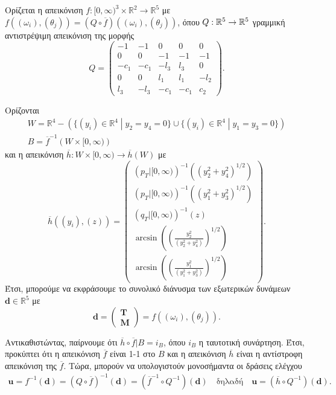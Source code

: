 Ορίζεται η απεικόνιση $f:[0, \infty)^3\times \mathbb{R}^2\rightarrow \mathbb{R}
^5$ με  ${f}\left( (\omega_i),(\theta_j) \right) = \left(Q \circ \overline{f} 
\right)\left( (\omega_i),(\theta_j) \right)$, όπου $Q:\mathbb{R}^{5} \rightarrow 
\mathbb{R}^{5}$ γραμμική αντιστρέψιμη απεικόνιση της μορφής
\begin{equation*}
    Q =
    \begin{pmatrix}
        -1  & -1   & 0    & 0   & 0    \\
        0   & 0    & -1   & -1  & -1   \\
        -c_1 & -c_1  & -l_3 & l_3 & 0    \\
        0   & 0    & l_1  & l_1 & -l_2 \\
        l_3 & -l_3 & -c_1  & -c_1 & c_2
    \end{pmatrix}.
\end{equation*}

Ορίζονται
\begin{gather*}
    W = \mathbb{R}^4 - \left( \{(y_i)\in\mathbb{R}^4 \middle| y_2=y_4=0\}
    \cup \{(y_i)\in\mathbb{R}^4 \middle| y_1=y_3=0\}\right) \\
    B = \overline{f}^{-1}\left(W\times[0,\infty)\right)
\end{gather*}
και η απεικόνιση $\overline{h}:W\times[0,\infty) \rightarrow\overline{h}(W)$ με
\begin{equation*}
    \overline{h}\left((y_i),(z)\right) =
    \begin{pmatrix}
        \left(p_T\big|[0,\infty)\right)^{-1}\left((y_2^2+y_4^2)^{1/2}\right) \\
        \left(p_T\big|[0,\infty)\right)^{-1}\left((y_1^2+y_3^2)^{1/2}\right) \\
        \left(q_T\big|[0,\infty)\right)^{-1}\left(z\right)                  \\
        \arcsin\left(\left(\frac{y_2^2}{(y_2^2+y_4^2)}\right)^{1/2}\right) \\
        \arcsin\left(\left(\frac{y_1^2}{(y_1^2+y_3^2)}\right)^{1/2}\right)
    \end{pmatrix}.
\end{equation*}
Έτσι, μπορούμε να εκφράσουμε το συνολικό διάνυσμα των εξωτερικών δυνάμεων 
$\mathbf{d} \in \mathbb{R}^5$ με
\begin{equation*}
    \mathbf{d} = 
    \begin{pmatrix}
        \mathbf{T} \\[6pt]
        \mathbf{M}
    \end{pmatrix}
    = {f}\left( (\omega_i),(\theta_j) \right).
\end{equation*}

Αντικαθιστώντας, παίρνουμε ότι $\overline{h}\circ\overline{f}\big|B = i_B$, όπου
$i_B$ η ταυτοτική συνάρτηση. Έτσι, προκύπτει ότι η απεικόνιση $\overline{f}$ 
είναι 1-1 στο $B$ και η απεικόνιση $\overline{h}$ είναι η αντίστροφη απεικόνιση 
της $\overline{f}$. Τώρα, μπορούν να υπολογιστούν μονοσήμαντα οι δράσεις ελέγχου
\begin{gather*}
    \mathbf{u} = f^{-1}(\mathbf{d}) = (Q \circ \overline{f})^{-1}(\mathbf{d}) = 
    (\overline{f}^{-1} \circ Q^{-1})(\mathbf{d}) \quad \text{δηλαδή} \quad
    \mathbf{u} = (\overline{h} \circ Q^{-1})(\mathbf{d}).
\end{gather*}